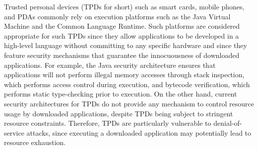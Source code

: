 Trusted personal devices (TPDs for short) such as smart cards,
mobile phones, and PDAs commonly rely on execution platforms such as the Java
Virtual Machine and the Common Language Runtime. Such platforms are
considered appropriate for such TPDs since they allow applications to
be developed in a high-level language without committing to any
specific hardware and since they feature security mechanisms that
guarantee the innocuousness of downloaded applications. For example,
the Java security architecture ensures that applications will not
perform illegal memory accesses through stack inspection, which
performs access control during execution, and bytecode verification,
which performs static type-checking prior to execution.  On the other
hand, current security architectures for TPDs do not provide any
mechanism to control resource usage by downloaded applications,
despite TPDs being subject to stringent resource constraints.
Therefore, TPDs are particularly vulnerable to denial-of-service
attacks, since executing a downloaded application may potentially lead
to resource exhaustion.


